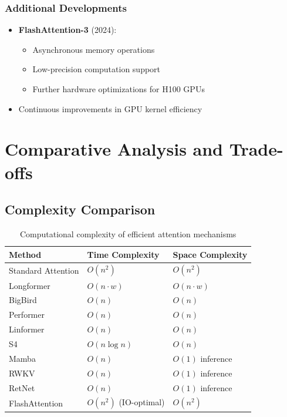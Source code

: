 \documentclass[11pt]{article}
\begin{document}
\subsubsection{Additional Developments}
\begin{itemize}[leftmargin=*]
    \item \textbf{FlashAttention-3} (2024):
    \begin{itemize}
        \item Asynchronous memory operations
        \item Low-precision computation support
        \item Further hardware optimizations for H100 GPUs
    \end{itemize}
    \item Continuous improvements in GPU kernel efficiency
\end{itemize}

\section{Comparative Analysis and Trade-offs}

\subsection{Complexity Comparison}

\begin{table}[h]
\centering
\begin{tabular}{lll}
\hline
\textbf{Method} & \textbf{Time Complexity} & \textbf{Space Complexity} \\
\hline
Standard Attention & $O(n^2)$ & $O(n^2)$ \\
Longformer & $O(n \cdot w)$ & $O(n \cdot w)$ \\
BigBird & $O(n)$ & $O(n)$ \\
Performer & $O(n)$ & $O(n)$ \\
Linformer & $O(n)$ & $O(n)$ \\
S4 & $O(n \log n)$ & $O(n)$ \\
Mamba & $O(n)$ & $O(1)$ inference \\
RWKV & $O(n)$ & $O(1)$ inference \\
RetNet & $O(n)$ & $O(1)$ inference \\
FlashAttention & $O(n^2)$ (IO-optimal) & $O(n^2)$ \\
\hline
\end{tabular}
\caption{Computational complexity of efficient attention mechanisms}
\end{table}
\end{document}
